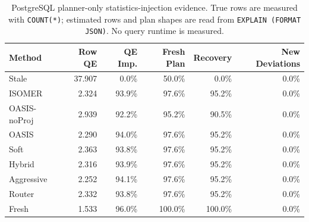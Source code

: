 \begin{table}[t]
  \centering
  \small
  \caption{PostgreSQL planner-only statistics-injection evidence. True rows are measured with \texttt{COUNT(*)}; estimated rows and plan shapes are read from \texttt{EXPLAIN (FORMAT JSON)}. No query runtime is measured.}
  \label{tab:postgres_planner_stats_injection}
  \setlength{\tabcolsep}{4pt}
  \begin{tabular}{lrrrrr}
    \toprule
    Method & Row QE & QE Imp. & Fresh Plan & Recovery & New Deviations \\
    \midrule
    Stale & 37.907 & 0.0\% & 50.0\% & 0.0\% & 0.0\% \\
    ISOMER & 2.324 & 93.9\% & 97.6\% & 95.2\% & 0.0\% \\
    OASIS-noProj & 2.939 & 92.2\% & 95.2\% & 90.5\% & 0.0\% \\
    OASIS & 2.290 & 94.0\% & 97.6\% & 95.2\% & 0.0\% \\
    Soft & 2.363 & 93.8\% & 97.6\% & 95.2\% & 0.0\% \\
    Hybrid & 2.316 & 93.9\% & 97.6\% & 95.2\% & 0.0\% \\
    Aggressive & 2.252 & 94.1\% & 97.6\% & 95.2\% & 0.0\% \\
    Router & 2.332 & 93.8\% & 97.6\% & 95.2\% & 0.0\% \\
    Fresh & 1.533 & 96.0\% & 100.0\% & 100.0\% & 0.0\% \\
    \bottomrule
  \end{tabular}
\end{table}

